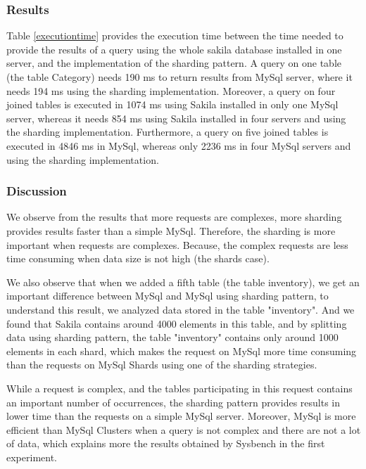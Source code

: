 \documentclass[10pt, conference]{IEEEtran}
\begin{document}
\subsubsection{Results} Table \ref{executiontime} provides the execution time between the time needed to provide the results of a query using the whole sakila database installed in one server, and the implementation of the sharding pattern. A query on one table (the table Category) needs 190 ms to return results from MySql server, where it needs 194 ms using the sharding implementation. Moreover, a query on four joined tables is executed in 1074 ms using Sakila installed in only one MySql server, whereas it needs 854 ms using Sakila installed in four servers and using the sharding implementation. Furthermore, a query on five joined tables is executed in 4846 ms in MySql, whereas only 2236 ms in four MySql servers and using the sharding implementation. 

\subsubsection{Discussion} We observe from the results that more requests are complexes, more sharding provides results faster than a simple MySql. Therefore, the sharding is more important when requests are complexes. Because, the complex requests are less time consuming when data size is not high (the shards case). 

We also observe that when we added a fifth table (the table inventory), we get an important difference between MySql and MySql using sharding pattern, to understand this result, we analyzed data stored in the table "inventory". And we found that Sakila contains around 4000 elements in this table, and by splitting data using sharding pattern, the table "inventory" contains only around 1000 elements in each shard, which makes the request on MySql more time consuming than the requests on MySql Shards using one of the sharding strategies. 

While a request is complex, and the tables participating in this request contains an important number of occurrences, the sharding pattern provides results in lower time than the requests on a simple MySql server. Moreover, MySql is more efficient than MySql Clusters when a query is not complex and there are not a lot of data, which explains more the results obtained by Sysbench in the first experiment.
\end{document}
